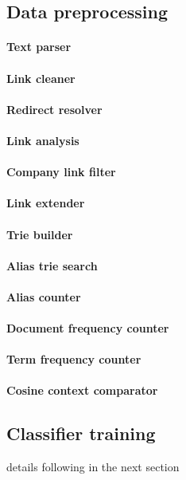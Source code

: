 \subsection{Data preprocessing}

\paragraph{Text parser}
\paragraph{Link cleaner}
\paragraph{Redirect resolver}
\paragraph{Link analysis}
\paragraph{Company link filter}
\paragraph{Link extender}
\paragraph{Trie builder}
\paragraph{Alias trie search}
\paragraph{Alias counter}
\paragraph{Document frequency counter}
\paragraph{Term frequency counter}
\paragraph{Cosine context comparator}

\subsection{Classifier training}
details following in the next section